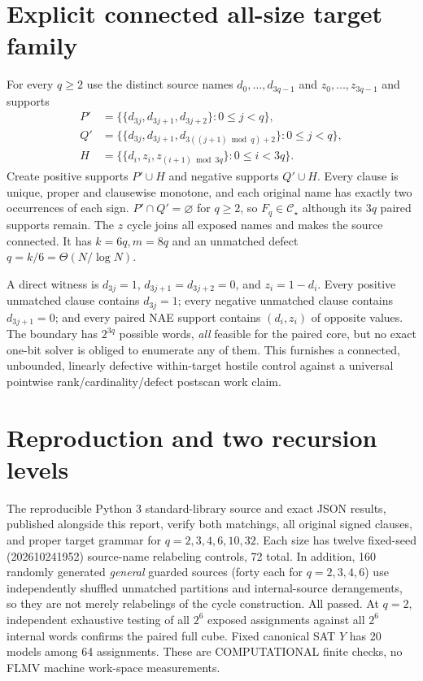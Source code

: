 \documentclass[11pt]{article}
\newcommand{\CS}{\mathcal C_\star}
\begin{document}
\section{Explicit connected all-size target family}
For every $q\ge2$ use the distinct source names $d_0,\ldots,d_{3q-1}$ and $z_0,\ldots,z_{3q-1}$ and supports
\begin{align*}
P'&=\{\{d_{3j},d_{3j+1},d_{3j+2}\}:0\le j<q\},\\
Q'&=\{\{d_{3j},d_{3j+1},d_{3((j+1)\bmod q)+2}\}:0\le j<q\},\\
H&=\{\{d_i,z_i,z_{(i+1)\bmod3q}\}:0\le i<3q\}.
\end{align*}
Create positive supports $P'\cup H$ and negative supports $Q'\cup H$. Every clause is unique, proper and clausewise monotone, and each original name has exactly two occurrences of each sign. $P'\cap Q'=\varnothing$ for $q\ge2$, so $F_q\in\CS$ although its $3q$ paired supports remain. The $z$ cycle joins all exposed names and makes the source connected. It has $k=6q,m=8q$ and an unmatched defect $q=k/6=\Theta(N/\log N)$.

A direct witness is $d_{3j}=1$, $d_{3j+1}=d_{3j+2}=0$, and $z_i=1-d_i$. Every positive unmatched clause contains $d_{3j}=1$; every negative unmatched clause contains $d_{3j+1}=0$; and every paired NAE support contains $(d_i,z_i)$ of opposite values. The boundary has $2^{3q}$ possible words, \emph{all} feasible for the paired core, but no exact one-bit solver is obliged to enumerate any of them. This furnishes a connected, unbounded, linearly defective within-target hostile control against a universal pointwise rank/cardinality/defect postscan work claim.

\section{Reproduction and two recursion levels}
The reproducible Python 3 standard-library source and exact JSON results, published alongside this report, verify both matchings, all original signed clauses, and proper target grammar for $q=2,3,4,6,10,32$. Each size has twelve fixed-seed (202610241952) source-name relabeling controls, 72 total. In addition, 160 randomly generated \emph{general} guarded sources (forty each for $q=2,3,4,6$) use independently shuffled unmatched partitions and internal-source derangements, so they are not merely relabelings of the cycle construction. All passed. At $q=2$, independent exhaustive testing of all $2^6$ exposed assignments against all $2^6$ internal words confirms the paired full cube. Fixed canonical SAT $Y$ has 20 models among 64 assignments. These are COMPUTATIONAL finite checks, no FLMV machine work-space measurements.
\end{document}
